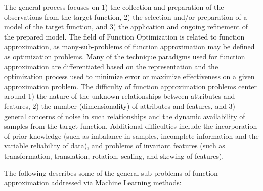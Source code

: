 The general process focuses on 1) the collection and preparation of the observations from the target function, 2) the selection and/or preparation of a model of the target function, and 3) the application and ongoing refinement of the prepared model. 
The field of Function Optimization is related to function approximation, as many-sub-problems of function approximation may be defined as optimization problems. Many of the technique paradigms used for function approximation are differentiated based on the representation and the optimization process used to minimize error or maximize effectiveness on a given approximation problem. 
The difficulty of function approximation problems center around 1) the nature of the unknown relationships between attributes and features, 2) the number (dimensionality) of attributes and features, and 3) general concerns of noise in such relationships and the dynamic availability of samples from the target function.
Additional difficulties include the incorporation of prior knowledge (such as imbalance in samples, incomplete information and the variable reliability of data), and problems of invariant features (such as transformation, translation, rotation, scaling, and skewing of features).

The following describes some of the general sub-problems of function approximation addressed via Machine Learning methods:

